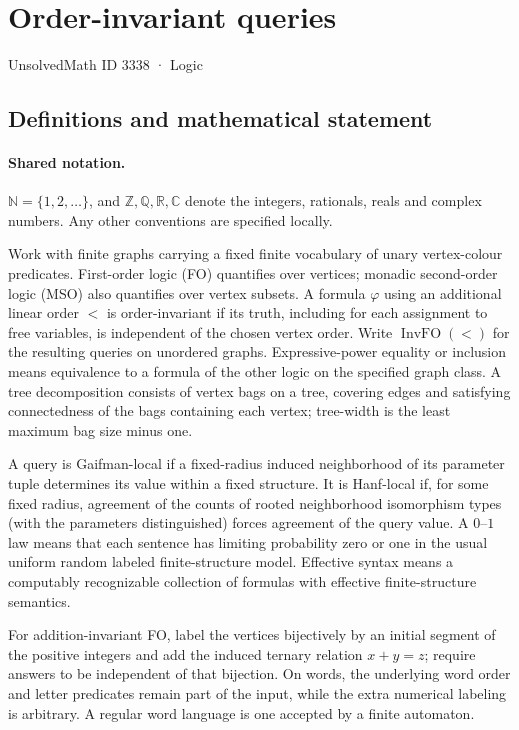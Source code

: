 \documentclass[11pt]{article}
\begin{document}
\setcounter{section}{3337}
\section{Order-invariant queries}\label{3338}
{\small\sffamily UnsolvedMath ID 3338 · Logic}
\subsection{Definitions and mathematical statement}

\paragraph{Shared notation.}$\mathbb N=\{1,2,\ldots\}$, and $\mathbb Z,\mathbb Q,\mathbb R,\mathbb C$ denote the integers, rationals, reals and complex numbers. Any other conventions are specified locally.


Work with finite graphs carrying a fixed finite vocabulary of unary vertex-colour predicates. First-order logic (FO) quantifies over vertices; monadic second-order logic (MSO) also quantifies over vertex subsets. A formula $\varphi$ using an additional linear order $<$ is order-invariant if its truth, including for each assignment to free variables, is independent of the chosen vertex order. Write $\operatorname{InvFO}(<)$ for the resulting queries on unordered graphs. Expressive-power equality or inclusion means equivalence to a formula of the other logic on the specified graph class. A tree decomposition consists of vertex bags on a tree, covering edges and satisfying connectedness of the bags containing each vertex; tree-width is the least maximum bag size minus one.\par
A query is Gaifman-local if a fixed-radius induced neighborhood of its parameter tuple determines its value within a fixed structure. It is Hanf-local if, for some fixed radius, agreement of the counts of rooted neighborhood isomorphism types (with the parameters distinguished) forces agreement of the query value. A $0$--$1$ law means that each sentence has limiting probability zero or one in the usual uniform random labeled finite-structure model. Effective syntax means a computably recognizable collection of formulas with effective finite-structure semantics.\par
For addition-invariant FO, label the vertices bijectively by an initial segment of the positive integers and add the induced ternary relation $x+y=z$; require answers to be independent of that bijection. On words, the underlying word order and letter predicates remain part of the input, while the extra numerical labeling is arbitrary. A regular word language is one accepted by a finite automaton.
\end{document}
